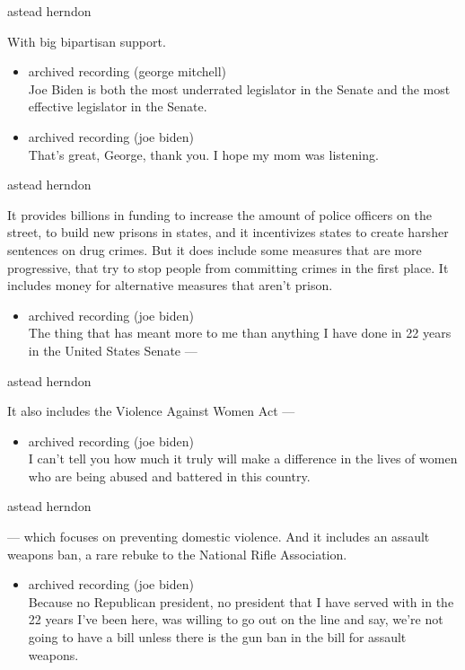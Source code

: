 astead herndon

With big bipartisan support.

\begin{itemize}
\item
  archived recording (george mitchell)\\
  Joe Biden is both the most underrated legislator in the Senate and the
  most effective legislator in the Senate.
\item
  archived recording (joe biden)\\
  That's great, George, thank you. I hope my mom was listening.
\end{itemize}

astead herndon

It provides billions in funding to increase the amount of police
officers on the street, to build new prisons in states, and it
incentivizes states to create harsher sentences on drug crimes. But it
does include some measures that are more progressive, that try to stop
people from committing crimes in the first place. It includes money for
alternative measures that aren't prison.

\begin{itemize}
\tightlist
\item
  archived recording (joe biden)\\
  The thing that has meant more to me than anything I have done in 22
  years in the United States Senate ---
\end{itemize}

astead herndon

It also includes the Violence Against Women Act ---

\begin{itemize}
\tightlist
\item
  archived recording (joe biden)\\
  I can't tell you how much it truly will make a difference in the lives
  of women who are being abused and battered in this country.
\end{itemize}

astead herndon

--- which focuses on preventing domestic violence. And it includes an
assault weapons ban, a rare rebuke to the National Rifle Association.

\begin{itemize}
\tightlist
\item
  archived recording (joe biden)\\
  Because no Republican president, no president that I have served with
  in the 22 years I've been here, was willing to go out on the line and
  say, we're not going to have a bill unless there is the gun ban in the
  bill for assault weapons.
\end{itemize}

